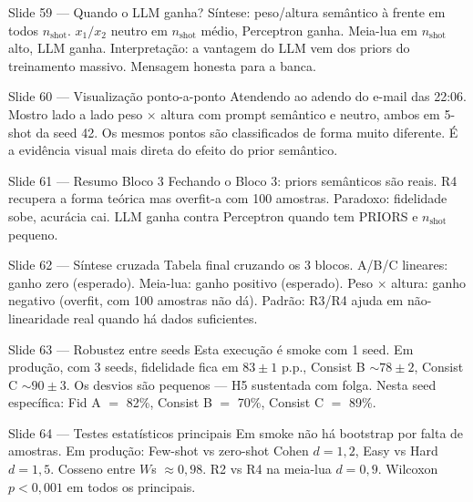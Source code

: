 \documentclass[aspectratio=169,10pt]{beamer}
\begin{document}
\begin{frame}{Slide 59 --- Quando o LLM ganha?}
\footnotesize
S\'intese: peso/altura sem\^antico \`a frente em todos $n_{\text{shot}}$. $x_1/x_2$ neutro em $n_{\text{shot}}$ m\'edio, Perceptron ganha. Meia-lua em $n_{\text{shot}}$ alto, LLM ganha. Interpreta\c{c}\~ao: a vantagem do LLM vem dos priors do treinamento massivo. Mensagem honesta para a banca.
\end{frame}

\begin{frame}{Slide 60 --- Visualiza\c{c}\~ao ponto-a-ponto}
\footnotesize
Atendendo ao adendo do e-mail das 22:06. Mostro lado a lado peso $\times$ altura com prompt sem\^antico e neutro, ambos em 5-shot da seed 42. Os mesmos pontos s\~ao classificados de forma muito diferente. \'E a evid\^encia visual mais direta do efeito do prior sem\^antico.
\end{frame}

\begin{frame}{Slide 61 --- Resumo Bloco 3}
\footnotesize
Fechando o Bloco 3: priors sem\^anticos s\~ao reais. R4 recupera a forma te\'orica mas overfit-a com 100 amostras. Paradoxo: fidelidade sobe, acur\'acia cai. LLM ganha contra Perceptron quando tem PRIORS e $n_{\text{shot}}$ pequeno.
\end{frame}

\begin{frame}{Slide 62 --- S\'intese cruzada}
\footnotesize
Tabela final cruzando os 3 blocos. A/B/C lineares: ganho zero (esperado). Meia-lua: ganho positivo (esperado). Peso $\times$ altura: ganho negativo (overfit, com 100 amostras n\~ao d\'a). Padr\~ao: R3/R4 ajuda em n\~ao-linearidade real quando h\'a dados suficientes.
\end{frame}

\begin{frame}{Slide 63 --- Robustez entre seeds}
\footnotesize
Esta execu\c{c}\~ao \'e smoke com 1 seed. Em produ\c{c}\~ao, com 3 seeds, fidelidade fica em $83 \pm 1$ p.p., Consist B $\sim 78 \pm 2$, Consist C $\sim 90 \pm 3$. Os desvios s\~ao pequenos --- H5 sustentada com folga. Nesta seed espec\'ifica: Fid A $=$ 82\%, Consist B $=$ 70\%, Consist C $=$ 89\%.
\end{frame}

\begin{frame}{Slide 64 --- Testes estat\'isticos principais}
\footnotesize
Em smoke n\~ao h\'a bootstrap por falta de amostras. Em produ\c{c}\~ao: Few-shot vs zero-shot Cohen $d=1{,}2$, Easy vs Hard $d=1{,}5$. Cosseno entre $W$s $\approx 0{,}98$. R2 vs R4 na meia-lua $d=0{,}9$. Wilcoxon $p<0{,}001$ em todos os principais.
\end{frame}
\end{document}
